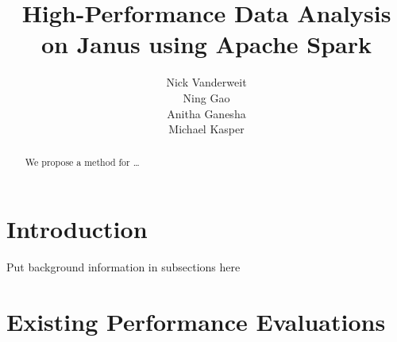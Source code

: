 \documentclass{article}
\title{High-Performance Data Analysis on Janus using Apache Spark}
\author{Nick Vanderweit \\
        Ning Gao \\
        Anitha Ganesha \\
        Michael Kasper}
\begin{document}
\maketitle

\begin{abstract}
We propose a method for \ldots
\end{abstract}

\section*{Introduction}
Put background information in subsections here \cite{fenn-dtk2006b}


\section*{Existing Performance Evaluations }
\end{document}
